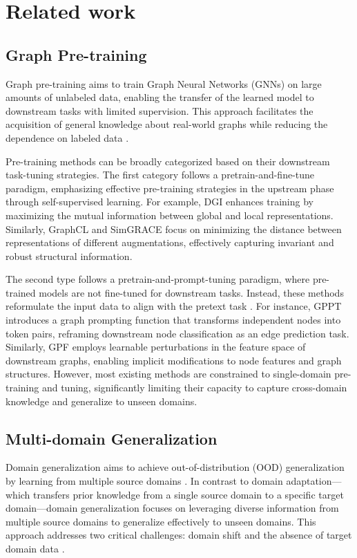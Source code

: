 \section{Related work}
\subsection{Graph Pre-training}

Graph pre-training aims to train Graph Neural Networks (GNNs) on large amounts of unlabeled data, enabling the transfer of the learned model to downstream tasks with limited supervision. This approach facilitates the acquisition of general knowledge about real-world graphs while reducing the dependence on labeled data \cite{hu2020gpt, jin2020self}.

Pre-training methods can be broadly categorized based on their downstream task-tuning strategies. The first category follows a pretrain-and-fine-tune paradigm, emphasizing effective pre-training strategies in the upstream phase through self-supervised learning. For example, DGI \cite{velickovic2019deep} enhances training by maximizing the mutual information between global and local representations. Similarly, GraphCL \cite{you2020graph} and SimGRACE \cite{xia2022simgrace} focus on minimizing the distance between representations of different augmentations, effectively capturing invariant and robust structural information.

The second type follows a pretrain-and-prompt-tuning paradigm, where pre-trained models are not fine-tuned for downstream tasks. Instead, these methods reformulate the input data to align with the pretext task \cite{gao2020making}. For instance, GPPT \cite{sun2022gppt} introduces a graph prompting function that transforms independent nodes into token pairs, reframing downstream node classification as an edge prediction task. Similarly, GPF \cite{fang2024universal} employs learnable perturbations in the feature space of downstream graphs, enabling implicit modifications to node features and graph structures. However, most existing methods are constrained to single-domain pre-training and tuning, significantly limiting their capacity to capture cross-domain knowledge and generalize to unseen domains.


\subsection{Multi-domain Generalization}

Domain generalization aims to achieve out-of-distribution (OOD) generalization by learning from multiple source domains \cite{zhou2022domain}. In contrast to domain adaptation—which transfers prior knowledge from a single source domain to a specific target domain—domain generalization focuses on leveraging diverse information from multiple source domains to generalize effectively to unseen domains. This approach addresses two critical challenges: domain shift and the absence of target domain data \cite{blanchard2011generalizing}.

